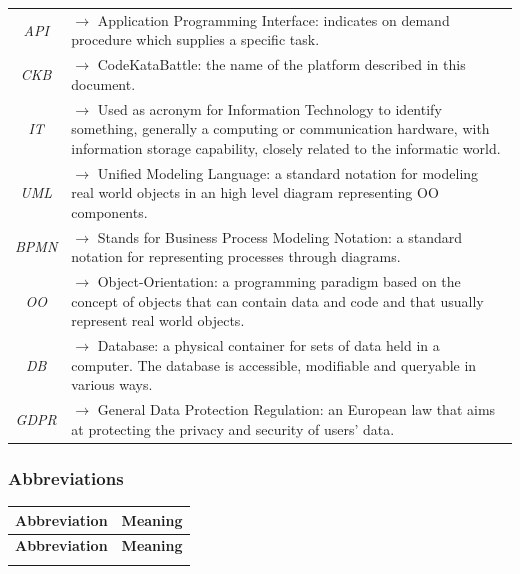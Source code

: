 \documentclass{article}
\begin{document}
{\begin{xltabular}{\textwidth}{ >{\raggedright\arraybackslash}c >{\raggedright\arraybackslash}X }
    \textit{API} & $\rightarrow$ Application Programming Interface: indicates on demand procedure which supplies a specific task.
    \\
    \textit{CKB} & $\rightarrow$ CodeKataBattle: the name of the platform described in this document.
    \\
    \textit{IT} & $\rightarrow$ Used as acronym for Information Technology to identify something, 
    generally a computing or communication hardware, with information storage capability, closely related to the informatic world.
    \\
    \textit{UML} & $\rightarrow$ Unified Modeling Language: a standard notation for modeling real world objects in an high level diagram
     representing OO components.
    \\
    \textit{BPMN} & $\rightarrow$ Stands for Business Process Modeling Notation: a standard notation for representing processes through diagrams.
    \\
    \textit{OO} & $\rightarrow$ Object-Orientation: a programming paradigm based on the concept of objects that can contain data and code
     and that usually represent real world objects.
    \\
    \textit{DB} & $\rightarrow$ Database: a physical container for sets of data held in a computer. 
    The database is accessible, modifiable and queryable in various ways.
    \\
    \textit{GDPR} & $\rightarrow$ General Data Protection Regulation: an European law that aims at protecting the privacy and security of users' data.
\end{xltabular}


\subsubsection{Abbreviations}
\begin{xltabular}{\textwidth}{ >{\raggedright\arraybackslash}c >{\raggedright\arraybackslash}X }
    \hline
    \textbf{Abbreviation} & \textbf{Meaning} \\
    \hline

    \endfirsthead

    \hline
    \textbf{Abbreviation} & \textbf{Meaning} \\
    \hline

    \endhead
    \endfoot
    \endlastfoot


\end{xltabular}}
\end{document}

